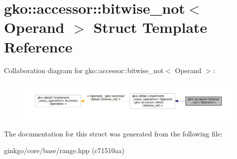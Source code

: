 \hypertarget{structgko_1_1accessor_1_1bitwise__not}{}\section{gko\+:\+:accessor\+:\+:bitwise\+\_\+not$<$ Operand $>$ Struct Template Reference}
\label{structgko_1_1accessor_1_1bitwise__not}


Collaboration diagram for gko\+:\+:accessor\+:\+:bitwise\+\_\+not$<$ Operand $>$\+:
\nopagebreak
\begin{figure}[H]
\begin{center}
\leavevmode
\includegraphics[width=350pt]{structgko_1_1accessor_1_1bitwise__not__coll__graph}
\end{center}
\end{figure}


The documentation for this struct was generated from the following file\+:\begin{DoxyCompactItemize}
\item 
ginkgo/core/base/range.\+hpp (c71510aa)\end{DoxyCompactItemize}

